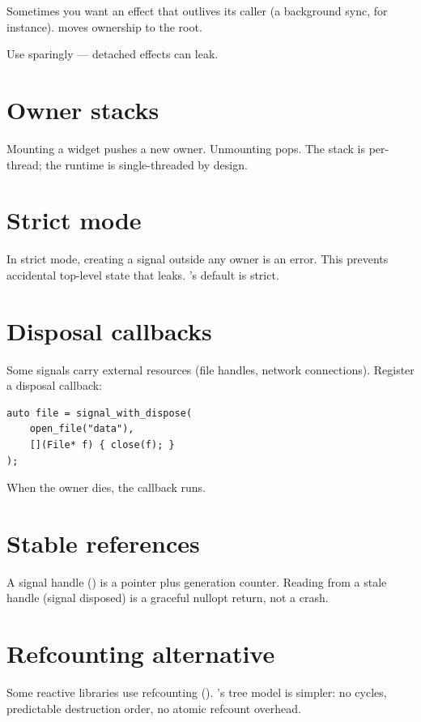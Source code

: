 Sometimes you want an effect that outlives its caller (a
background sync, for instance). 
moves ownership to the root.

Use sparingly --- detached effects can leak.

\section{Owner stacks}

Mounting a widget pushes a new owner. Unmounting pops. The
stack is per-thread; the runtime is single-threaded by
design.

\section{Strict mode}

In strict mode, creating a signal outside any owner is an
error. This prevents accidental top-level state that leaks.
\maya{}'s default is strict.

\section{Disposal callbacks}

Some signals carry external resources (file handles, network
connections). Register a disposal callback:

\begin{lstlisting}
auto file = signal_with_dispose(
    open_file("data"),
    [](File* f) { close(f); }
);
\end{lstlisting}

When the owner dies, the callback runs.

\section{Stable references}

A signal handle () is a pointer plus
generation counter. Reading from a stale handle (signal
disposed) is a graceful nullopt return, not a crash.

\section{Refcounting alternative}

Some reactive libraries use refcounting ().
\maya{}'s tree model is simpler: no cycles, predictable
destruction order, no atomic refcount overhead.

